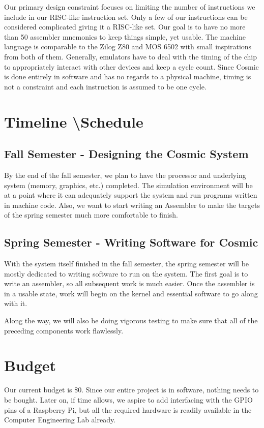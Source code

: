 \documentclass[conference]{IEEEtran}
\begin{document}
Our primary design constraint focuses on limiting the number of instructions we include in our RISC-like instruction set. Only a few of our instructions can be considered complicated giving it a RISC-like set. Our goal is to have no more than 50 assembler mnemonics to keep things simple, yet usable. The machine language is comparable to the Zilog Z80 and MOS 6502 with small inspirations from both of them. Generally, emulators have to deal with the timing of the chip to appropriately interact with other devices and keep a cycle count. Since Cosmic is done entirely in software and has no regards to a physical machine, timing is not a constraint and each instruction is assumed to be one cycle. 


\section{Timeline \textbackslash Schedule}

\subsection{Fall Semester - Designing the Cosmic System}
By the end of the fall semester, we plan to have the processor and underlying system (memory, graphics, etc.) completed. The simulation environment will be at a point where it can adequately support the system and run programs written in machine code. Also, we want to start writing an Assembler to make the targets of the spring semester much more comfortable to finish.

\subsection{Spring Semester - Writing Software for Cosmic}
With the system itself finished in the fall semester, the spring semester will be mostly dedicated to writing software to run on the system. The first goal is to write an assembler, so all subsequent work is much easier. Once the assembler is in a usable state, work will begin on the kernel and essential software to go along with it.

Along the way, we will also be doing vigorous testing to make sure that all of the preceding components work flawlessly.

\section{Budget}

Our current budget is \$0. Since our entire project is in software, nothing needs to be bought. Later on, if time allows, we aspire to add interfacing with the GPIO pins of a Raspberry Pi, but all the required hardware is readily available in the Computer Engineering Lab already.
\end{document}
